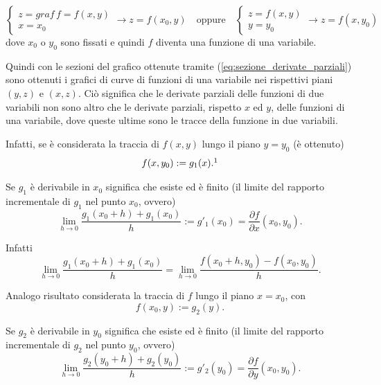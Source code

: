 \begin{equation}\label{eq:sezione_derivate_parziali}
    \begin{cases}
        z=graf\, f=f(x,y)\\
        x=x_0
    \end{cases}\rightarrow z=f(x_0,y)
    \quad\text{oppure}\quad
    \begin{cases}
        z=f(x,y)\\
        y=y_0
    \end{cases}\rightarrow z=f(x,y_0)
\end{equation}
dove $x_0$ o $y_0$ sono fissati e quindi $f$ diventa una funzione di una variabile.

Quindi con le sezioni del grafico ottenute tramite (\ref{eq:sezione_derivate_parziali}) sono ottenuti i grafici di curve di funzioni di una variabile nei rispettivi piani $(y,z)$ e $(x,z)$. Ciò significa che le derivate parziali delle funzioni di due variabili non sono altro che le derivate parziali, rispetto $x$ ed $y$, delle funzioni di una variabile, dove queste ultime sono le tracce della funzione in due variabili.

Infatti, se è considerata la traccia di $f(x,y)$ lungo il piano $y=y_0$ (è ottenuto)
\begin{equation*}
    f(x,y_0):=g_1(x). \footnotemark
\end{equation*}

Se $g_1$ è derivabile in $x_0$ significa che esiste ed è finito (il limite del rapporto incrementale di $g_1$ nel punto $x_0$, ovvero)
\begin{equation*}
    \lim_{h\rightarrow 0}\frac{g_1(x_0+h)+g_1(x_0)}{h}:=g'_1(x_0)=\frac{\partial f}{\partial x}(x_0,y_0).
\end{equation*}

Infatti
\begin{equation*}
    \lim_{h\rightarrow 0}\frac{g_1(x_0+h)+g_1(x_0)}{h}=\lim_{h\rightarrow 0}\frac{f(x_0+h,y_0)-f(x_0,y_0)}{h}.
\end{equation*}

Analogo risultato considerata la traccia di $f$ lungo il piano $x=x_0$, con
\begin{equation*}
    f(x_0,y):=g_2(y).
\end{equation*}

Se $g_2$ è derivabile in $y_0$ significa che esiste ed è finito (il limite del rapporto incrementale di $g_2$ nel punto $y_0$, ovvero)
\begin{equation*}
    \lim_{h\rightarrow 0}\frac{g_2(y_0+h)+g_2(y_0)}{h}:=g'_2(y_0)=\frac{\partial f}{\partial y}(x_0,y_0).
\end{equation*}

